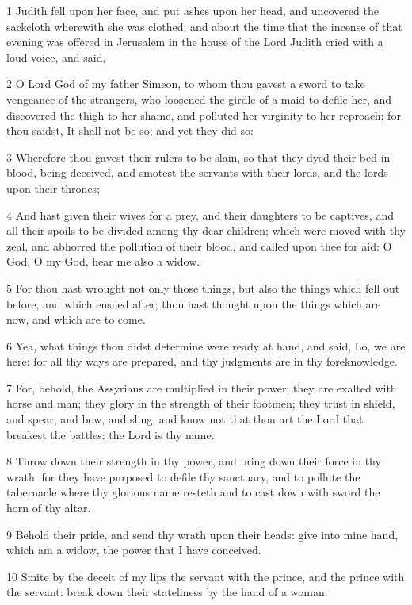\par 1 Judith fell upon her face, and put ashes upon her head, and uncovered the sackcloth wherewith she was clothed; and about the time that the incense of that evening was offered in Jerusalem in the house of the Lord Judith cried with a loud voice, and said,
\par 2 O Lord God of my father Simeon, to whom thou gavest a sword to take vengeance of the strangers, who loosened the girdle of a maid to defile her, and discovered the thigh to her shame, and polluted her virginity to her reproach; for thou saidst, It shall not be so; and yet they did so:
\par 3 Wherefore thou gavest their rulers to be slain, so that they dyed their bed in blood, being deceived, and smotest the servants with their lords, and the lords upon their thrones;
\par 4 And hast given their wives for a prey, and their daughters to be captives, and all their spoils to be divided among thy dear children; which were moved with thy zeal, and abhorred the pollution of their blood, and called upon thee for aid: O God, O my God, hear me also a widow.
\par 5 For thou hast wrought not only those things, but also the things which fell out before, and which ensued after; thou hast thought upon the things which are now, and which are to come.
\par 6 Yea, what things thou didst determine were ready at hand, and said, Lo, we are here: for all thy ways are prepared, and thy judgments are in thy foreknowledge.
\par 7 For, behold, the Assyrians are multiplied in their power; they are exalted with horse and man; they glory in the strength of their footmen; they trust in shield, and spear, and bow, and sling; and know not that thou art the Lord that breakest the battles: the Lord is thy name.
\par 8 Throw down their strength in thy power, and bring down their force in thy wrath: for they have purposed to defile thy sanctuary, and to pollute the tabernacle where thy glorious name resteth and to cast down with sword the horn of thy altar.
\par 9 Behold their pride, and send thy wrath upon their heads: give into mine hand, which am a widow, the power that I have conceived.
\par 10 Smite by the deceit of my lips the servant with the prince, and the prince with the servant: break down their stateliness by the hand of a woman.
